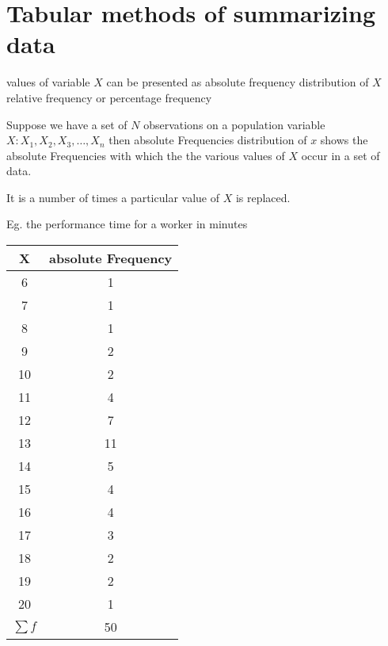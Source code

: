 \chapter{Tabular methods of summarizing data} %

values of variable $X$ can be presented as absolute frequency distribution of $X$ relative frequency or percentage frequency


Suppose we have a set of $N$ observations on a population variable $X: X_1, X_2, X_3, \ldots, X_n$ then absolute Frequencies distribution of $x$ shows the absolute Frequencies with which the the various values of $X$ occur in a set of data.

It is a number of times a particular value of $X$ is replaced.

Eg. the performance time for a worker in minutes


\begin{table}[H]
    \centering
    \begin{tabular}{|c|c|}
        \hline X        & absolute Frequency \\
        \hline 6        & 1                  \\
        \hline 7        & 1                  \\
        \hline 8        & 1                  \\
        \hline 9        & 2                  \\
        \hline 10       & 2                  \\
        \hline 11       & 4                  \\
        \hline 12       & 7                  \\
        \hline 13       & 11                 \\
        \hline 14       & 5                  \\
        \hline 15       & 4                  \\
        \hline 16       & 4                  \\
        \hline 17       & 3                  \\
        \hline 18       & 2                  \\
        \hline 19       & 2                  \\
        \hline 20       & 1                  \\
        \hline $\sum f$ & 50                 \\

        \hline
    \end{tabular}
\end{table}


